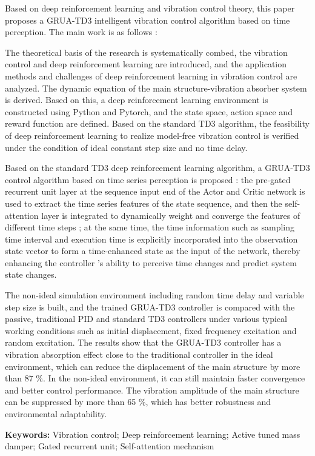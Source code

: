 \documentclass{scrbook}
\begin{document}
{Based on deep reinforcement learning and vibration control theory, this paper proposes a GRUA-TD3 intelligent vibration control algorithm based on time perception. The main work is as follows : 

The theoretical basis of the research is systematically combed, the vibration control and deep reinforcement learning are introduced, and the application methods and challenges of deep reinforcement learning in vibration control are analyzed. The dynamic equation of the main structure-vibration absorber system is derived. Based on this, a deep reinforcement learning environment is constructed using Python and Pytorch, and the state space, action space and reward function are defined. Based on the standard TD3 algorithm, the feasibility of deep reinforcement learning to realize model-free vibration control is verified under the condition of ideal constant step size and no time delay.

Based on the standard TD3 deep reinforcement learning algorithm, a GRUA-TD3 control algorithm based on time series perception is proposed : the pre-gated recurrent unit layer at the sequence input end of the Actor and Critic network is used to extract the time series features of the state sequence, and then the self-attention layer is integrated to dynamically weight and converge the features of different time steps ; at the same time, the time information such as sampling time interval and execution time is explicitly incorporated into the observation state vector to form a time-enhanced state as the input of the network, thereby enhancing the controller 's ability to perceive time changes and predict system state changes. 

The non-ideal simulation environment including random time delay and variable step size is built, and the trained GRUA-TD3 controller is compared with the passive, traditional PID and standard TD3 controllers under various typical working conditions such as initial displacement, fixed frequency excitation and random excitation. The results show that the GRUA-TD3 controller has a vibration absorption effect close to the traditional controller in the ideal environment, which can reduce the displacement of the main structure by more than 87 \%. In the non-ideal environment, it can still maintain faster convergence and better control performance. The vibration amplitude of the main structure can be suppressed by more than 65 \%, which has better robustness and environmental adaptability.

\textbf{Keywords: }Vibration control; Deep reinforcement learning; Active tuned mass damper; Gated recurrent unit; Self-attention mechanism

}
\end{document}
